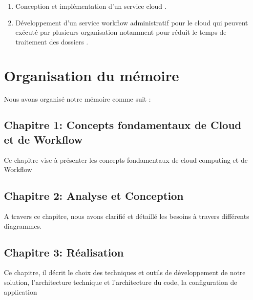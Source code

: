 \begin{enumerate}
\item Conception et implémentation d'un service cloud .
 
\item Développement d'un service workflow administratif  pour le cloud qui peuvent exécuté par plusieurs  organisation notamment pour réduit le temps de traitement des dossiers .  
\end{enumerate}


\section*{Organisation du mémoire}

Nous avons organisé notre mémoire comme suit : 
\subsection*{Chapitre 1: Concepts fondamentaux de Cloud et de Workflow} 

Ce chapitre vise à présenter les concepts fondamentaux de cloud computing  et de Workflow 
\subsection*{Chapitre 2: Analyse et Conception} 
A travers ce chapitre, nous avons clarifié et détaillé les besoins à travers différents diagrammes. 
\subsection*{Chapitre 3: Réalisation}


Ce chapitre, il décrit le choix des techniques et outils de développement de notre solution, l’architecture technique et l’architecture du code, la configuration de application 
